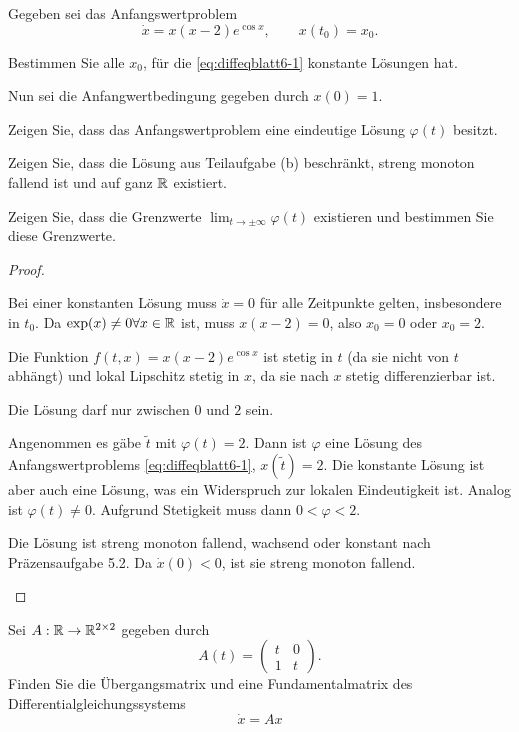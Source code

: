 \begin{Problem}
	Gegeben sei das Anfangswertproblem
	\begin{equation}\label{eq:diffeqblatt6-1}
	\dot{x}=x(x-2)e^{\cos x},\qquad x(t_0)=x_0.
\end{equation}
	\begin{parts}
		\item Bestimmen Sie alle $x_0$, f\"{u}r die \eqref{eq:diffeqblatt6-1} konstante L\"{o}sungen hat.
		
		Nun sei die Anfangwertbedingung gegeben durch $x(0)=1$.
		\item Zeigen Sie, dass das Anfangswertproblem eine eindeutige L\"{o}sung $\varphi(t)$ besitzt.
		\item Zeigen Sie, dass die L\"{o}sung aus Teilaufgabe (b) beschr\"{a}nkt, streng monoton fallend ist und auf ganz $\mathbb{R}$ existiert.
		\item Zeigen Sie, dass die Grenzwerte $\lim_{t\to \pm \infty} \varphi(t)$ existieren und bestimmen Sie diese Grenzwerte.
	\end{parts}
\end{Problem}
\begin{proof}
	\begin{parts}
		\item Bei einer konstanten L\"{o}sung muss $\dot{x}=0$ f\"{u}r alle Zeitpunkte gelten, insbesondere in $t_0$. Da $\exp(x)\neq 0\forall x\in \mathbb{R}$ ist, muss $x(x-2)=0$, also $x_0=0$ oder $x_0=2$.
		\item Die Funktion $f(t, x)=x(x-2)e^{\cos x}$ ist stetig in $t$ (da sie nicht von $t$ abhängt) und lokal Lipschitz stetig in $x$, da sie nach $x$ stetig differenzierbar ist.
		\item Die L\"{o}sung darf nur zwischen $0$ und $2$ sein. 
		
		Angenommen es g\"{a}be $\tilde{t}$ mit $\varphi(t)=2$. Dann ist $\varphi$ eine L\"{o}sung des Anfangswertproblems \eqref{eq:diffeqblatt6-1}, $x(\tilde{t})=2$. Die konstante L\"{o}sung ist aber auch eine L\"{o}sung, was ein Widerspruch zur lokalen Eindeutigkeit ist. Analog ist $\varphi(t)\neq 0$. Aufgrund Stetigkeit muss dann $0<\varphi<2$.
		
		Die L\"{o}sung ist streng monoton fallend, wachsend oder konstant nach Präzensaufgabe 5.2. Da $\dot{x}(0)<0$, ist sie streng monoton fallend.
	\end{parts}
\end{proof}
\begin{Problem}
	Sei $A:\mathbb{R}\to \mathbb{R}^{2\times 2}$ gegeben durch
	\[A(t)=\begin{pmatrix}
		t & 0 \\
		1 & t
	\end{pmatrix}.\]
	Finden Sie die \"{U}bergangsmatrix und eine Fundamentalmatrix des Differentialgleichungssystems
	\[\dot{x}=Ax\]
\end{Problem}
